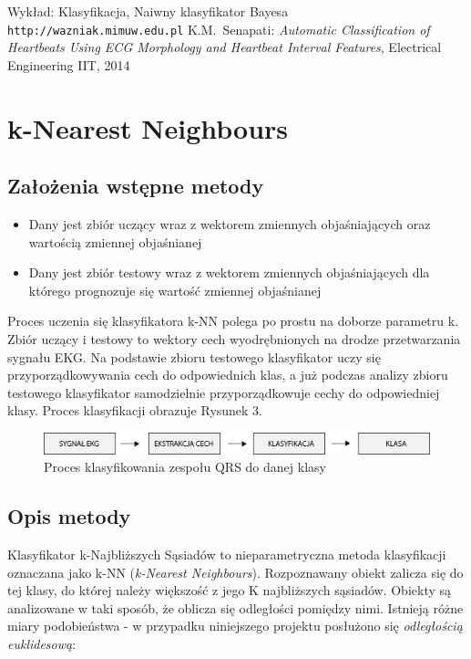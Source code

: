 \documentclass[[10pt,a4paper]{article}
\begin{document}
\begin{thebibliography}{99}
 Wykład: Klasyfikacja, Naiwny klasyfikator Bayesa
\\\texttt{http://wazniak.mimuw.edu.pl}
 K.M.~Senapati:
\emph{Automatic Classification of Heartbeats Using ECG Morphology and Heartbeat Interval Features}, Electrical Engineering IIT, 2014
\end{thebibliography}

\newpage
\section{k-Nearest Neighbours}
\subsection{Założenia wstępne metody} 
\begin{itemize}
\item Dany jest zbiór uczący wraz z wektorem zmiennych objaśniających oraz wartością zmiennej objaśnianej
\item Dany jest zbiór testowy wraz z wektorem zmiennych objaśniających dla którego prognozuje się wartość zmiennej objaśnianej
\end{itemize}


Proces uczenia się klasyfikatora k-NN polega po prostu na doborze parametru k. Zbiór uczący i testowy to wektory cech wyodrębnionych na drodze przetwarzania sygnału EKG. Na podstawie zbioru testowego klasyfikator uczy się przyporządkowywania cech do odpowiednich klas, a już podczas analizy zbioru testowego klasyfikator samodzielnie przyporządkowuje cechy do odpowiedniej klasy. Proces klasyfikacji obrazuje Rysunek 3.
\begin{figure}[h]
\centering
\includegraphics[scale=0.6]{algorytm.png}
\caption{Proces klasyfikowania zespołu QRS do danej klasy}
\end{figure}

\subsection{Opis metody ~\cite{doktorska}}
Klasyfikator k-Najbliższych Sąsiadów to nieparametryczna metoda klasyfikacji oznaczana jako k-NN (\emph{k-Nearest Neighbours}). Rozpoznawany obiekt zalicza się do tej klasy, do której należy większość z jego K najbliższych sąsiadów. Obiekty są analizowane w taki sposób, że oblicza się odległości pomiędzy nimi. Istnieją różne miary podobieństwa - w przypadku niniejszego projektu posłużono się \emph{odległością euklidesową}:
\end{document}
